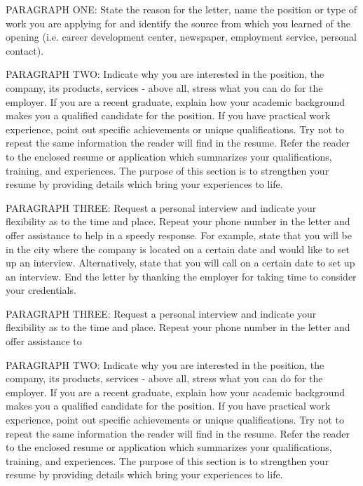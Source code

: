 \documentclass{article}
\begin{document}




PARAGRAPH ONE: State the reason for the letter, name the position or type of work you are applying for and identify the source from which you learned of the opening (i.e. career development center, newspaper, employment service, personal contact).

PARAGRAPH TWO: Indicate why you are interested in the position, the company, its products, services - above all, stress what you can do for the employer. If you are a recent graduate, explain how your academic background makes you a qualified candidate for the position. If you have practical work experience, point out specific achievements or unique qualifications. Try not to repeat the same information the reader will find in the resume. Refer the reader to the enclosed resume or application which summarizes your qualifications, training, and experiences. The purpose of this section is to strengthen your resume by providing details which bring your experiences to life. 
 
PARAGRAPH THREE: Request a personal interview and indicate your flexibility as to the time and place. Repeat your phone number in the letter and offer assistance to help in a speedy response. For example, state that you will be in the city where the company is located on a certain date and would like to set up an interview. Alternatively, state that you will call on a certain date to set up an interview. End the letter by thanking the employer for taking time to consider your credentials. 

 
PARAGRAPH THREE: Request a personal interview and indicate your flexibility as to the time and place. Repeat your phone number in the letter and offer assistance to 

PARAGRAPH TWO: Indicate why you are interested in the position, the company, its products, services - above all, stress what you can do for the employer. If you are a recent graduate, explain how your academic background makes you a qualified candidate for the position. If you have practical work experience, point out specific achievements or unique qualifications. Try not to repeat the same information the reader will find in the resume. Refer the reader to the enclosed resume or application which summarizes your qualifications, training, and experiences. The purpose of this section is to strengthen your resume by providing details which bring your experiences to life. 
 
\end{document}
